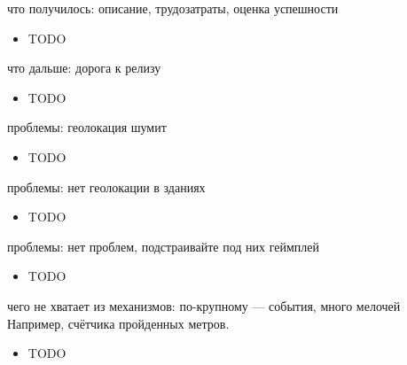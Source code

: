 \documentclass[aspectratio=169,handout,bigger]{beamer}
\begin{document}

\begin{frame}{что получилось: описание, трудозатраты, оценка успешности}
  \begin{itemize}
    \item TODO
  \end{itemize}
\end{frame}


\begin{frame}{что дальше: дорога к релизу}
  \begin{itemize}
    \item TODO
  \end{itemize}
\end{frame}


\begin{frame}{проблемы: геолокация шумит}
  \begin{itemize}
    \item TODO
  \end{itemize}
\end{frame}


\begin{frame}{проблемы: нет геолокации в зданиях}
  \begin{itemize}
    \item TODO
  \end{itemize}
\end{frame}


\begin{frame}{проблемы: нет проблем, подстраивайте под них геймплей}
  \begin{itemize}
    \item TODO
  \end{itemize}
\end{frame}


\begin{frame}{чего не хватает из механизмов: по-крупному --- события, много мелочей}
Например, счётчика пройденных метров.
\begin{itemize}
  \item TODO
\end{itemize}
\end{frame}
\end{document}
